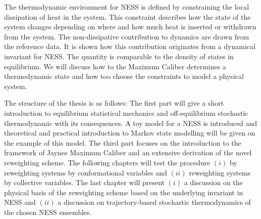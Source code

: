 The thermodynamic environment for NESS is defined by constraining the local dissipation of heat in the system. This constraint describes how the state of the system changes depending on where and how much heat is inserted or withdrawn from the system. The non-dissipative contribution to dynamics are drawn from the reference data. It is shown how this contribution originates from a dynamical invariant for NESS. The quantity is comparable to the density of states in equilibrium. We will discuss how to the Maximum Caliber determines a thermodynamic state and how too choose the constraints to model a physical system. 


The structure of the thesis is as follows: The first part will give a short introduction to equilibrium statistical mechanics and off-equilibrium stochastic thermodynamic with its consequences. A toy model for a NESS is introduced and  theoretical and practical introduction to Markov state modelling will be given on the example of this model. The third part focuses on the introduction to the framework of Jaynes Maximum Caliber and an extensive derivation of the novel reweighting scheme. The following chapters will test the procedure $(i)$ by reweighting systems by conformational variables and  $(ii)$ reweighting systems by  collective variables. The last chapter will present $(i)$ a discussion on the physical basis of the reweighting scheme based on the underlying invariant in NESS and $(ii)$ a discussion on trajectory-based stochastic thermodynamics of the chosen NESS ensembles. 

  

%   
% 
% 
% 
% 
